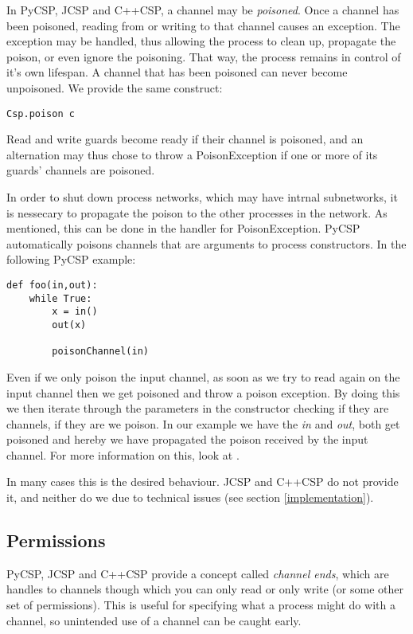 \documentclass[a4paper,12pt]{article}
\begin{document}
In PyCSP, JCSP and C++CSP, a channel may be \emph{poisoned}. Once a channel
has been poisoned, reading from or writing to that channel causes an exception.
The exception may be handled, thus allowing the process to clean up, propagate
the poison, or even ignore the poisoning. That way, the process remains in
control of it's own lifespan. A channel that has been poisoned can never become
unpoisoned. We provide the same construct:

\begin{verbatim}
Csp.poison c 
\end{verbatim}

Read and write guards become ready if their channel is poisoned, and an
alternation may thus chose to throw a PoisonException if one or more of its
guards' channels are poisoned.

In order to shut down process networks, which may have intrnal subnetworks, it
is nessecary to propagate the poison to the other processes in the network. As
mentioned, this can be done in the handler for PoisonException. PyCSP
automatically poisons channels that are arguments to process constructors. In 
the following PyCSP example:
\begin{verbatim}
def foo(in,out):
    while True:
        x = in()
        out(x)
        
        poisonChannel(in)
\end{verbatim}
Even if we only poison the input channel, as soon as we try to read again on
the input channel then we get poisoned and throw a poison exception. By doing
this we then iterate through the parameters in the constructor checking if
they are channels, if they are we poison. In our example we have the {\it in}
and {\it out}, both get poisoned and hereby we have propagated the poison
received by the input channel. For more information on this, look at
\cite{pycsp}.

In many cases this is the desired behaviour. JCSP and C++CSP do not provide it,
and neither do we due to technical issues (see section \ref{implementation}).

\subsection{Permissions}

PyCSP, JCSP and C++CSP provide a concept called \emph{channel ends}, which are
handles to channels though which you can only read or only write (or some other
set of permissions). This is useful for specifying what a process might do with
a channel, so unintended use of a channel can be caught early.
\end{document}
